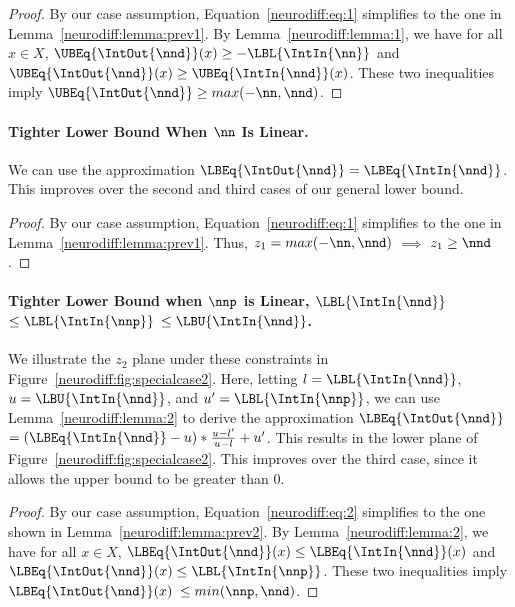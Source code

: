 \begin{proof}
By our case assumption, Equation~\ref{neurodiff:eq:1} simplifies to the one in
Lemma~\ref{neurodiff:lemma:prev1}. By Lemma~\ref{neurodiff:lemma:1}, we have for
all $ x \in X $,
$ \UBEq{\IntOut{\nnd}}(x) \geq -\LBL{\IntIn{\nn}} $ and
$ \UBEq{\IntOut{\nnd}}(x) \geq \UBEq{\IntIn{\nnd}}(x) $. These two inequalities
imply $ \UBEq{\IntOut{\nnd}} \geq max(-\nn, \nnd) $.
\end{proof}

\paragraph{Tighter Lower Bound When $ \nn $ Is Linear.}

We can use the approximation $ \LBEq{\IntOut{\nnd}}
= \LBEq{\IntIn{\nnd}} $. This improves over the second and third cases
of our general lower bound.

\begin{proof}
By our case assumption, Equation~\ref{neurodiff:eq:1} simplifies to the one in
Lemma~\ref{neurodiff:lemma:prev1}. Thus, $ z_1 = max(-\nn, \nnd) $ $ \implies $
$ z_1 \geq \nnd $.
\end{proof}

\paragraph{Tighter Lower Bound when $ \nnp $ is Linear, $ \LBL{\IntIn{\nnd}}
$ $ \leq \LBL{\IntIn{\nnp}} $ $ \leq \LBU{\IntIn{\nnd}}$.}
We illustrate the $ z_2 $ plane under these constraints in
Figure~\ref{neurodiff:fig:specialcase2}.
Here, letting $ l = \LBL{\IntIn{\nnd}} $, $ u = \LBU{\IntIn{\nnd}} $,
and $ u' = \LBL{\IntIn{\nnp}} $, we can use Lemma~\ref{neurodiff:lemma:2} to
derive the approximation $ \LBEq{\IntOut{\nnd}} $ $ =
(\LBEq{\IntIn{\nnd}} - u)*\frac{u - l'}{u - l} + u' $. This results in the
lower plane of Figure~\ref{neurodiff:fig:specialcase2}. This improves
over the third case, since it allows the upper bound to be greater
than 0.

\begin{proof}
By our case assumption, Equation~\ref{neurodiff:eq:2} simplifies to the one shown
in
Lemma~\ref{neurodiff:lemma:prev2}. By Lemma~\ref{neurodiff:lemma:2}, we have for
all $ x \in X $,
$ \LBEq{\IntOut{\nnd}}(x) \leq \LBEq{\IntIn{\nnd}}(x) $ and
$ \LBEq{\IntOut{\nnd}}(x) \leq \LBL{\IntIn{\nnp}} $. These two inequalities
imply
$ \LBEq{\IntOut{\nnd}}(x)$ $ \leq min(\nnp, \nnd) $.
\end{proof}



